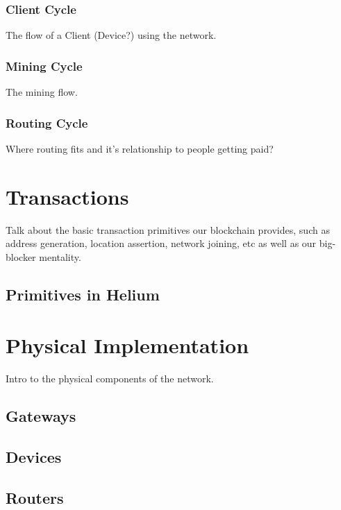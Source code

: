 \documentclass[letterpaper,11pt]{article}
\begin{document}
\subsubsection{Client Cycle}

The flow of a Client (Device?) using the network.

\subsubsection{Mining Cycle}

The mining flow.

\subsubsection{Routing Cycle}

Where routing fits and it's relationship to people getting paid?

\section{Transactions} \label{transactions}

Talk about the basic transaction primitives our blockchain provides, such as address generation, location assertion, network joining, etc as well as our big-blocker mentality.

\subsection{Primitives in Helium}

\section{Physical Implementation}

Intro to the physical components of the network.

\subsection{Gateways}

\subsection{Devices}

\subsection{Routers}
\end{document}
